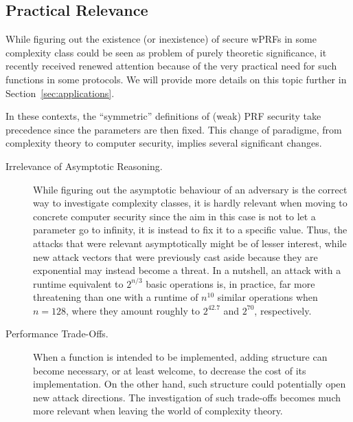 \documentclass[journal=tosc,submission]{iacrtrans}
\theoremstyle{theorem}
\newcommand\lp[1]{\textcolor{blue!80}{\textbf{Léo:} #1}}
\newcommand\yr[1]{\textcolor{brown!80}{\textbf{Yann:} #1}}
\begin{document}

  


\subsection{Practical Relevance}

While figuring out the existence (or inexistence) of secure wPRFs in some complexity class could be seen as problem of  purely theoretic significance, it recently received renewed attention because of the very practical need for such functions in some protocols. We will provide more details on this topic further in Section~\ref{sec:applications}.

In these contexts, the ``symmetric'' definitions of (weak) PRF security take precedence since the parameters are then fixed. This change of paradigme, from complexity theory to computer security, implies several significant changes.
\begin{description}
\item[Irrelevance of Asymptotic Reasoning.] While figuring out the asymptotic behaviour of an adversary is the correct way to investigate complexity classes, it is hardly relevant when moving to concrete computer security since the aim in this case is not to let a parameter go to infinity, it is instead to fix it to a specific value. Thus, the attacks that were relevant asymptotically might be of lesser interest, while new attack vectors that were previously cast aside because they are exponential may instead become a threat. In a nutshell, an attack with a runtime equivalent to $2^{n/3}$ basic operations is, in practice, far more threatening than one with a runtime of $n^{10}$ similar operations when $n = 128$, where they amount roughly to $2^{42.7}$ and $2^{70}$, respectively.
\item[Performance Trade-Offs.] When a function is intended to be implemented, adding structure can become necessary, or at least welcome, to decrease the cost of its implementation. On the other hand, such structure could potentially open new attack directions. The investigation of such trade-offs becomes much more relevant when leaving the world of complexity theory.
\end{description}
\end{document}

